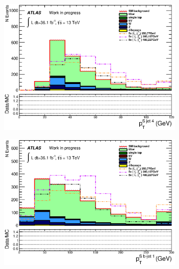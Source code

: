 \begin{figure}[h!]
  \begin{center}
    \begin{subfigure}[a]{0.45\textwidth}    
    	 \includegraphics[width=\textwidth]{figures/plotSR/SR_ND1_pTjV4_3SR.eps}\hspace{0.05\textwidth}
                \caption{ }
    \end{subfigure}
    \begin{subfigure}[a]{0.45\textwidth}    
    	 \includegraphics[width=\textwidth]{figures/plotSR/SR_ND1_pTbV1_3SR.eps}\hspace{0.05\textwidth}
                \caption{ }
    \end{subfigure}
    \begin{subfigure}[a]{0.45\textwidth}    

\end{subfigure}
\end{center}
\end{figure}
